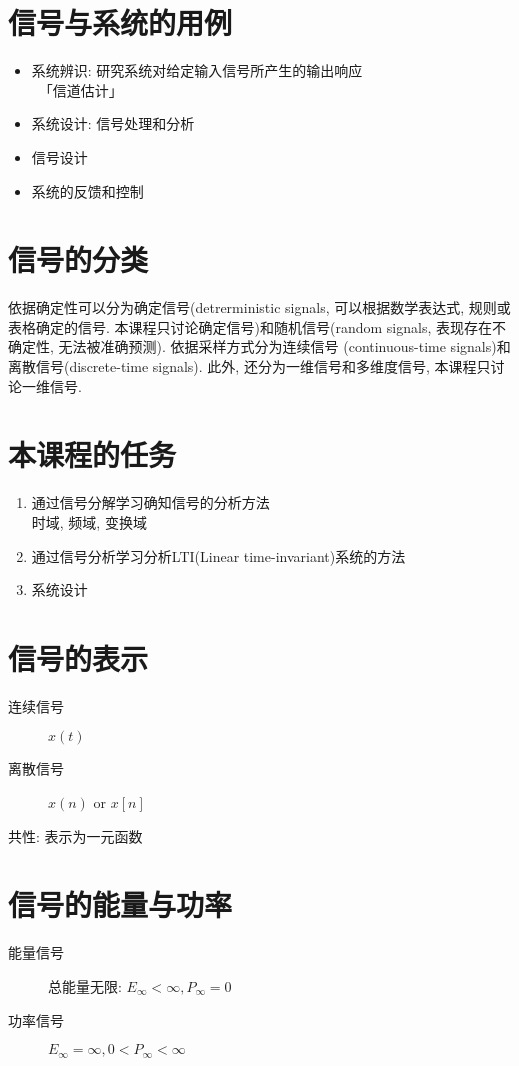 \section{信号与系统的用例}

    \begin{itemize}
        \item 系统辨识: 研究系统对给定输入信号所产生的输出响应\\\
            「信道估计」
        \item 系统设计: 信号处理和分析
        \item 信号设计
        \item 系统的反馈和控制
    \end{itemize}

\section{信号的分类}

    依据确定性可以分为确定信号(detrerministic signals, 可以根据数学表达式, 规则或表格确定的信号. 本课程只讨论确定信号)和随机信号(random signals, 表现存在不确定性, 无法被准确预测). 依据采样方式分为连续信号 (continuous-time signals)和离散信号(discrete-time signals). 此外, 还分为一维信号和多维度信号, 本课程只讨论一维信号.

\section{本课程的任务}

    \begin{enumerate}
        \item 通过信号分解学习确知信号的分析方法 \\
            时域, 频域, 变换域
        \item 通过信号分析学习分析LTI(Linear time-invariant)系统的方法
        \item 系统设计
    \end{enumerate}

\section{信号的表示}

    \begin{description}
        \item[连续信号] $x(t)$
        \item[离散信号] $x(n)$ or $x[n]$
    \end{description}

    共性: 表示为一元函数

\section{信号的能量与功率}

    \begin{description}
        \item[能量信号] 总能量无限: $E_\infty<\infty, P_\infty=0$
        \item[功率信号]     $E_\infty=\infty, 0<P_\infty<\infty$
    \end{description}
        
